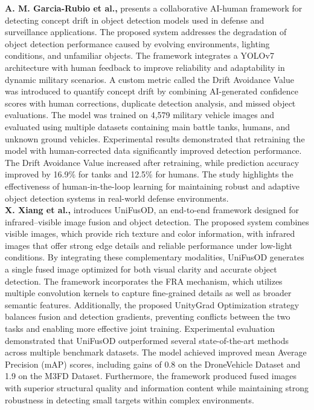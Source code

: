 \textbf{A. M. Garcia-Rubio et al.,} presents a collaborative AI-human framework for detecting concept drift in object detection models used in defense and surveillance applications. The proposed system addresses the degradation of object detection performance caused by evolving environments, lighting conditions, and unfamiliar objects. The framework integrates a YOLOv7 architecture with human feedback to improve reliability and adaptability in dynamic military scenarios. A custom metric called the Drift Avoidance Value was introduced to quantify concept drift by combining AI-generated confidence scores with human corrections, duplicate detection analysis, and missed object evaluations. The model was trained on 4,579 military vehicle images and evaluated using multiple datasets containing main battle tanks, humans, and unknown ground vehicles. Experimental results demonstrated that retraining the model with human-corrected data significantly improved detection performance. The Drift Avoidance Value increased after retraining, while prediction accuracy improved by 16.9\% for tanks and 12.5\% for humans. The study highlights the effectiveness of human-in-the-loop learning for maintaining robust and adaptive object detection systems in real-world defense environments. \textbf{\cite{supplementary_paper_4}} \\

\textbf{X. Xiang et al.,} introduces UniFusOD, an end-to-end framework designed for infrared–visible image fusion and object detection. The proposed system combines visible images, which provide rich texture and color information, with infrared images that offer strong edge details and reliable performance under low-light conditions. By integrating these complementary modalities, UniFusOD generates a single fused image optimized for both visual clarity and accurate object detection. The framework incorporates the FRA mechanism, which utilizes multiple convolution kernels to capture fine-grained details as well as broader semantic features. Additionally, the proposed UnityGrad Optimization strategy balances fusion and detection gradients, preventing conflicts between the two tasks and enabling more effective joint training. Experimental evaluation demonstrated that UniFusOD outperformed several state-of-the-art methods across multiple benchmark datasets. The model achieved improved mean Average Precision (mAP) scores, including gains of 0.8 on the DroneVehicle Dataset and 1.9 on the M3FD Dataset. Furthermore, the framework produced fused images with superior structural quality and information content while maintaining strong robustness in detecting small targets within complex environments. \textbf{\cite{supplementary_paper_5}} \\

